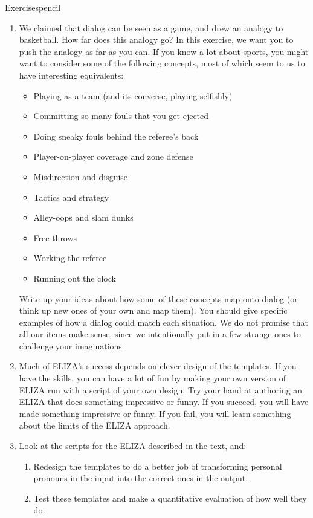 \begin{tblsfilledsymbol}{Exercises}{pencil}
\begin{enumerate}
\item  We claimed that dialog can be seen as a game, and drew an analogy to basketball. How far does this analogy go?
In this exercise, we want you to push the analogy as far as you can.
If you know a lot about sports, you might want to consider some of the following concepts, most of which seem to us to have interesting equivalents:
\begin{itemize}
	\item Playing as a team (and its converse, playing selfishly)
	\item Committing so many fouls that you get ejected
	\item Doing sneaky fouls behind the referee's back
	\item Player-on-player coverage and zone defense
	\item Misdirection and disguise
	\item Tactics and strategy
	\item Alley-oops and slam dunks
	\item Free throws
	\item Working the referee
	\item Running out the clock
\end{itemize}
	Write up your ideas about how some of these concepts map onto dialog (or think up new ones of your own and map them). You should give specific examples of how a dialog could match each situation. We do not promise that all our items make sense, since we intentionally put in a few strange ones  to challenge your imaginations.

\item   Much of ELIZA's success depends on clever design of the templates.  If you have the skills, you can have a lot of fun by making your own version of ELIZA run with a script of your own design.  Try your hand at authoring an ELIZA that does something impressive or funny. If you succeed, you will have made something impressive or funny. If you fail, you will learn something about the limits of the ELIZA approach. 

\item \label{ex:me:i} Look at the scripts for the ELIZA described in
  the text, and:
  \begin{enumerate}
  \item  Redesign the templates to do a better job of
    transforming personal pronouns in the input into the correct ones
    in the output. 
  \item Test these templates and make a quantitative
    evaluation of how well they do.
  \end{enumerate}


\end{enumerate}
\end{tblsfilledsymbol}
